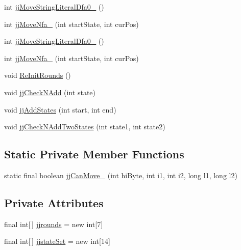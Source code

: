 \begin{DoxyCompactItemize}
\item 
int \hyperlink{classorg_1_1coode_1_1owlapi_1_1obo_1_1parser_1_1_o_b_o_parser_token_manager_a00bf2ab7b4ea321cab865f50ff19e3c4}{jj\-Move\-String\-Literal\-Dfa0\-\_} ()
\item 
int \hyperlink{classorg_1_1coode_1_1owlapi_1_1obo_1_1parser_1_1_o_b_o_parser_token_manager_a8387cccea8f309ca0febe2a981eaef62}{jj\-Move\-Nfa\-\_} (int start\-State, int cur\-Pos)
\item 
int \hyperlink{classorg_1_1coode_1_1owlapi_1_1obo_1_1parser_1_1_o_b_o_parser_token_manager_affeef6a327a788ebc5273f66411f108e}{jj\-Move\-String\-Literal\-Dfa0\-\_} ()
\item 
int \hyperlink{classorg_1_1coode_1_1owlapi_1_1obo_1_1parser_1_1_o_b_o_parser_token_manager_ae44ff4db57fb60e2725ebc8381f4b839}{jj\-Move\-Nfa\-\_} (int start\-State, int cur\-Pos)
\item 
void \hyperlink{classorg_1_1coode_1_1owlapi_1_1obo_1_1parser_1_1_o_b_o_parser_token_manager_a74fce0ed16c99dc3f3bae53ef52fcccd}{Re\-Init\-Rounds} ()
\item 
void \hyperlink{classorg_1_1coode_1_1owlapi_1_1obo_1_1parser_1_1_o_b_o_parser_token_manager_ad733c2172afd1df90d0df702c14b2796}{jj\-Check\-N\-Add} (int state)
\item 
void \hyperlink{classorg_1_1coode_1_1owlapi_1_1obo_1_1parser_1_1_o_b_o_parser_token_manager_a15218ba76efc288596f1547180cbbf75}{jj\-Add\-States} (int start, int end)
\item 
void \hyperlink{classorg_1_1coode_1_1owlapi_1_1obo_1_1parser_1_1_o_b_o_parser_token_manager_a12b3ae20d2bca35e514360911dafd7cc}{jj\-Check\-N\-Add\-Two\-States} (int state1, int state2)
\end{DoxyCompactItemize}
\subsection*{Static Private Member Functions}
\begin{DoxyCompactItemize}
\item 
static final boolean \hyperlink{classorg_1_1coode_1_1owlapi_1_1obo_1_1parser_1_1_o_b_o_parser_token_manager_ad46e724370a63885f27e94d854b806a1}{jj\-Can\-Move\-\_} (int hi\-Byte, int i1, int i2, long l1, long l2)
\end{DoxyCompactItemize}
\subsection*{Private Attributes}
\begin{DoxyCompactItemize}
\item 
final int\mbox{[}$\,$\mbox{]} \hyperlink{classorg_1_1coode_1_1owlapi_1_1obo_1_1parser_1_1_o_b_o_parser_token_manager_a89b714fb61218131ab423206df7860e0}{jjrounds} = new int\mbox{[}7\mbox{]}
\item 
final int\mbox{[}$\,$\mbox{]} \hyperlink{classorg_1_1coode_1_1owlapi_1_1obo_1_1parser_1_1_o_b_o_parser_token_manager_a79012ac8944de42e3ee76e9878381c64}{jjstate\-Set} = new int\mbox{[}14\mbox{]}
\end{DoxyCompactItemize}


